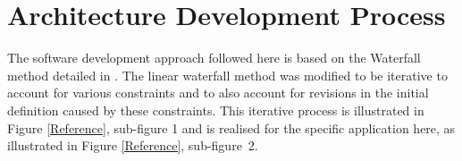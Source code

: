\documentclass[conference]{IEEEtran}
\begin{document}
\section{Architecture Development Process}\label{arch}

The software development approach followed here is based on the Waterfall method detailed in \cite{WaterfallCoding}. The linear waterfall method was modified to be iterative to account for various constraints and to also account for revisions in the initial definition caused by these constraints. This iterative process is illustrated in Figure \ref{Reference}, sub-figure 1 and is realised for the specific application here, as illustrated in Figure \ref{Reference}, sub-figure~2. %
%
%
\end{document}
